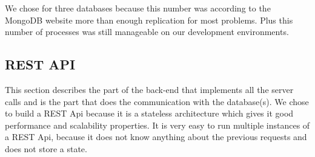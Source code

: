 We chose for three databases because this number was according to the MongoDB website more than enough replication for most problems. Plus this number of processes was still manageable on our development environments.

\subsection{REST API}
\label{ssec:2:restapi}
This section describes the part of the back-end that implements all the server calls and is the part that does the communication with the database(s). We chose to build a REST Api because it is a stateless architecture which gives it good performance and scalability properties. It is very easy to run multiple instances of a REST Api, because it does not know anything about the previous requests and does not store a state.

